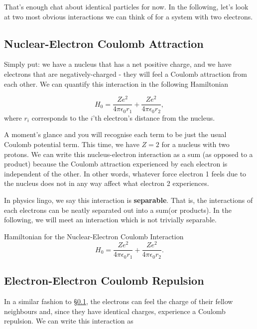 \documentclass{article}
\numberwithin{equation}{section} %
\begin{document}
That's enough chat about identical particles for now. In the following, let's look at two most obvious interactions we can think of for a system with two electrons.
\subsection{Nuclear-Electron Coulomb Attraction}\label{coulomb attraction}

Simply put: we have a nucleus that has a net positive charge, and we have electrons that are negatively-charged - they will feel a Coulomb attraction from each other. We can quantify this interaction in the following Hamiltonian

\begin{equation}
H_0=\frac{Ze^2}{4\pi\epsilon_0r_1} + \frac{Ze^2}{4\pi\epsilon_0r_2},
\label{coulomb attraction hamiltonian}
\end{equation}
where $r_i$ corresponds to the $i$'th electron's distance  from the nucleus. 

A moment's glance and you will recognise each term to be just the usual Coulomb potential term. This time, we have $Z=2$ for a nucleus with two protons. We can write this nucleus-electron interaction as a sum (as opposed to a product) because the Coulomb attraction experienced by each electron is independent of the other. In other words, whatever force electron 1 feels due to the nucleus does not in any way affect what electron 2 experiences. 

In physics lingo, we say this interaction is \textbf{separable}. That is, the interactions of each electrons can be neatly separated out into a sum(or products). In the following, we will meet an interaction which is not trivially separable.

\begin{tcolorbox}[colback=pink]
Hamiltonian for the Nuclear-Electron Coulomb Interaction
\begin{equation}
H_0=\frac{Ze^2}{4\pi\epsilon_0r_1} + \frac{Ze^2}{4\pi\epsilon_0r_2}.
\end{equation}
\end{tcolorbox}

\subsection{Electron-Electron Coulomb Repulsion}

In a similar fashion to \S\ref{coulomb attraction}, the electrons can feel the charge of their fellow neighbours and, since they have identical charges, experience a Coulomb repulsion. We can write this interaction as
\end{document}
